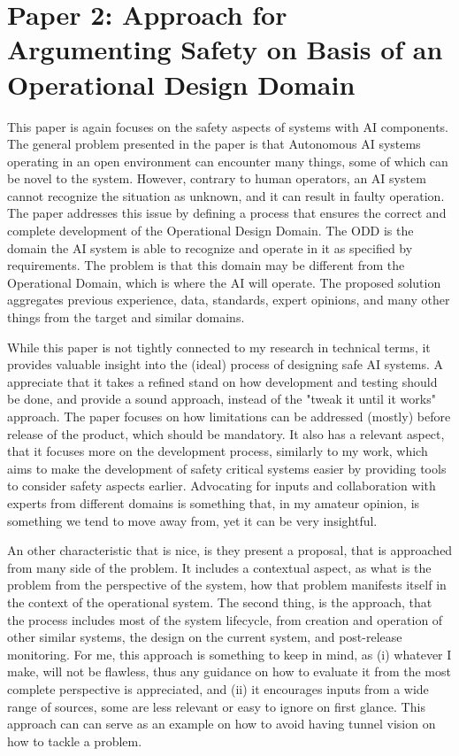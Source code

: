 \documentclass{article}
\begin{document}
\newpage
\section{Paper 2: Approach for Argumenting Safety on Basis of an Operational Design Domain}

This paper is again focuses on the safety aspects of systems with AI components.
The general problem presented in the paper is that Autonomous AI systems operating in an open environment can encounter many things, some of which can be novel to the system.
However, contrary to human operators, an AI system cannot recognize the situation as unknown, and it can result in faulty operation.
The paper addresses this issue by defining a process that ensures the correct and complete development of the Operational Design Domain. 
The ODD is the domain the AI system is able to recognize and operate in it as specified by requirements. The problem is that this domain may be different from the Operational Domain, which is where the AI will operate.
The proposed solution aggregates previous experience, data, standards, expert opinions, and many other things from the target and similar domains.

While this paper is not tightly connected to my research in technical terms, it provides valuable insight into the (ideal) process of designing safe AI systems.
A appreciate that it takes a refined stand on how development and testing should be done, and provide a sound approach, instead of the "tweak it until it works" approach.
The paper focuses on how limitations can be addressed (mostly) before release of the product, which should be mandatory.
It also has a relevant aspect, that it focuses more on the development process, similarly to my work, which aims to make the development of safety critical systems easier by providing tools to consider safety aspects earlier. 
Advocating for inputs and collaboration with experts from different domains is something that, in my amateur opinion, is something we tend to move away from, yet it can be very insightful.

An other characteristic that is nice, is they present a proposal, that is approached from many side of the problem.
It includes a contextual aspect, as what is the problem from the perspective of the system, how that problem manifests itself in the context of the operational system. 
The second thing, is the approach, that the process includes most of the system lifecycle, from creation and operation of other similar systems, the design on the current system, and post-release monitoring.
For me, this approach is something to keep in mind, as (i) whatever I make, will not be flawless, thus any guidance on how to evaluate it from the most complete perspective is appreciated, and (ii) it encourages inputs from a wide range of sources, some are less relevant or easy to ignore on first glance. 
This approach can can serve as an example on how to avoid having tunnel vision on how to tackle a problem.
\end{document}
